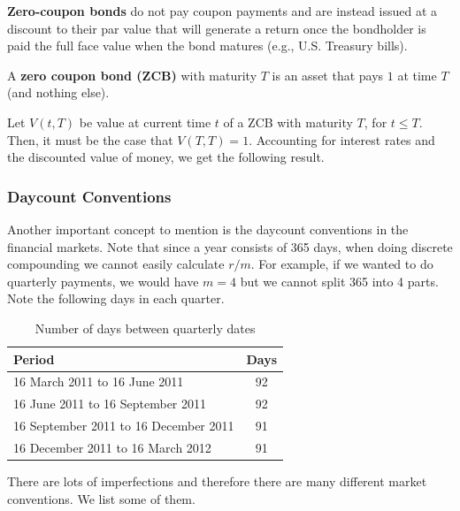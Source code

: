 \documentclass{article}
\begin{document}
    \begin{definition}
      \textbf{Zero-coupon bonds} do not pay coupon payments and are instead issued at a discount to their par value that will generate a return once the bondholder is paid the full face value when the bond matures (e.g., U.S. Treasury bills).
    \end{definition}

    \begin{definition}
      A \textbf{zero coupon bond (ZCB)} with maturity $T$ is an asset that pays $1$ at time $T$ (and nothing else). 
    \end{definition}

    Let $V(t, T)$ be value at current time $t$ of a ZCB with maturity $T$, for $t \leq T$. Then, it must be the case that $V(T, T) = 1$. Accounting for interest rates and the discounted value of money, we get the following result. 

    \subsubsection{Daycount Conventions}

      Another important concept to mention is the daycount conventions in the financial markets. Note that since a year consists of 365 days, when doing discrete compounding we cannot easily calculate $r/m$. For example, if we wanted to do quarterly payments, we would have $m = 4$ but we cannot split 365 into 4 parts. Note the following days in each quarter. 

      \begin{table}[H]
        \centering
        \caption{Number of days between quarterly dates}
        \label{table:quarterly_days}
        \begin{tabular}{@{}lc@{}}
        \hline
        Period                               & Days \\ 
        \hline
        16 March 2011 to 16 June 2011        & 92   \\
        16 June 2011 to 16 September 2011    & 92   \\
        16 September 2011 to 16 December 2011& 91   \\
        16 December 2011 to 16 March 2012    & 91   \\ 
        \hline
        \end{tabular}
      \end{table}
      
      There are lots of imperfections and therefore there are many different market conventions. We list some of them. 
\end{document}
